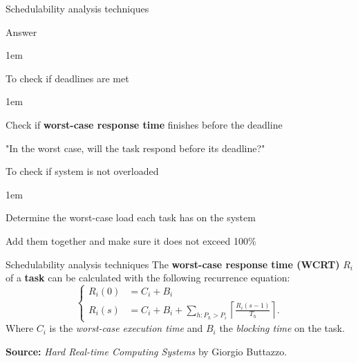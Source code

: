\begin{frame}{Schedulability analysis techniques}
    \begin{block}{Answer}
        \begin{itemize-size}{1em}
            \item To check if deadlines are met
            \begin{itemize-size}{1em}
                \vspace{0.5em}
                \item Check if \textbf{worst-case response time} finishes before the deadline
                \item "In the worst case, will the task respond before its deadline?"
            \end{itemize-size}
            \item To check if system is not overloaded
            \begin{itemize-size}{1em}
                \vspace{0.5em}
                \item Determine the worst-case load each task has on the system
                \item Add them together and make sure it does not exceed 100\%
            \end{itemize-size}
        \end{itemize-size} 
    \end{block}
\end{frame}

\begin{frame}{Schedulability analysis techniques}
    The \textbf{worst-case response time (WCRT)} $R_i$ of a \textbf{task} can be calculated with
    the following recurrence equation:
    \begin{equation}
        \begin{cases}
            R_{i}(0) &= C_i + B_i \\
            R_{i}(s) &= C_i + B_i + \sum\limits_{h: P_h > P_i} \left\lceil \frac{R_{i}(s-1)}{T_h} \right\rceil.
        \end{cases}
    \end{equation}
    Where $C_i$ is the \emph{worst-case execution time} and $B_i$ the
    \emph{blocking time} on the task.
    \vspace{1em}

    \textbf{Source:} \emph{Hard Real-time Computing Systems} by Giorgio Buttazzo.
\end{frame}


